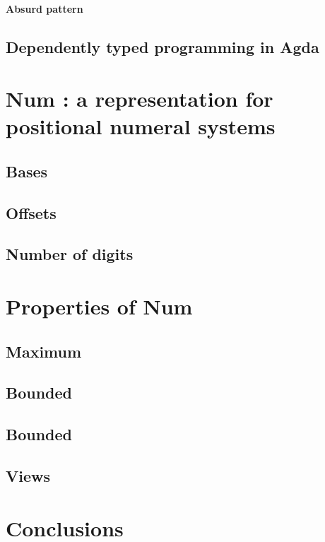 \documentclass[12pt, a4paper]{article}
\begin{document}
\paragraph{Absurd pattern}


\subsection{Dependently typed programming in Agda}


\section{Num : a representation for positional numeral systems}\label{representation}

\subsection{Bases}
\subsection{Offsets}
\subsection{Number of digits}

\section{Properties of Num}
\subsection{Maximum}
\subsection{Bounded}
\subsection{Bounded}
\subsection{Views}

\section{Conclusions}\label{conclusions}



\end{document}
